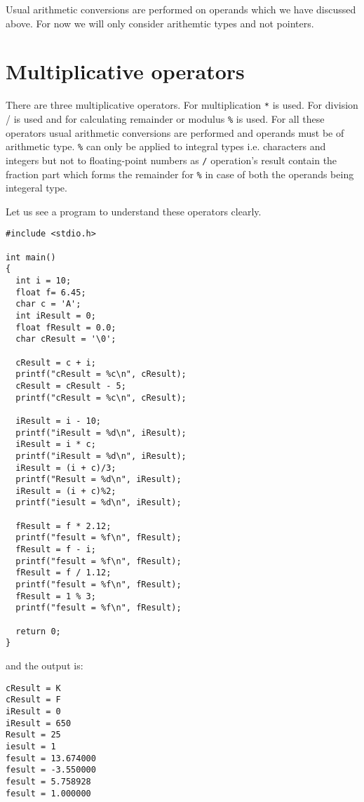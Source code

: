 Usual arithmetic conversions are performed on operands which we have discussed
above. For now we will only consider arithemtic types and not pointers.

\section{Multiplicative operators}
There are three multiplicative operators. For multiplication \texttt{*} is
used. For division / is used and for calculating remainder or modulus
\texttt{\%} is used. For all these operators usual arithmetic conversions are
performed and operands must be of arithmetic type. \texttt{\%} can only be
applied to integral types i.e. characters and integers but not to
floating-point numbers as \texttt{/} operation's result contain the fraction
part which forms the remainder for \texttt{\%} in case of both the operands
being integeral type.

Let us see a program to understand these operators clearly.
\begin{Verbatim}[frame=single]
#include <stdio.h>

int main()
{
  int i = 10;
  float f= 6.45;
  char c = 'A';
  int iResult = 0;
  float fResult = 0.0;
  char cResult = '\0';

  cResult = c + i;
  printf("cResult = %c\n", cResult);
  cResult = cResult - 5;
  printf("cResult = %c\n", cResult);

  iResult = i - 10;
  printf("iResult = %d\n", iResult);
  iResult = i * c;
  printf("iResult = %d\n", iResult);
  iResult = (i + c)/3;
  printf("Result = %d\n", iResult);
  iResult = (i + c)%2;
  printf("iesult = %d\n", iResult);

  fResult = f * 2.12;
  printf("fesult = %f\n", fResult);
  fResult = f - i;
  printf("fesult = %f\n", fResult);  
  fResult = f / 1.12;
  printf("fesult = %f\n", fResult);
  fResult = 1 % 3;
  printf("fesult = %f\n", fResult);

  return 0;
}
\end{Verbatim}

and the output is:

\begin{Verbatim}
cResult = K
cResult = F
iResult = 0
iResult = 650
Result = 25
iesult = 1
fesult = 13.674000
fesult = -3.550000
fesult = 5.758928
fesult = 1.000000
\end{Verbatim}

